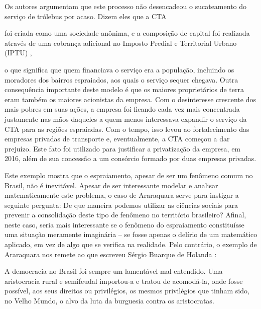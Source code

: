 Os autores argumentam que este processo não desencadeou o sucateamento do serviço de trólebus por acaso. Dizem eles que a CTA

\begin{displayquote}
    \textelp{} foi criada como uma sociedade anônima, e a composição de capital foi realizada através de uma cobrança adicional no Imposto Predial e Territorial Urbano (IPTU) \textelp{} \cite{BORCHERS:22},
\end{displayquote}
o que significa que quem financiava o serviço era a população, incluindo os moradores dos bairros espraiados, aos quais o serviço sequer chegava. Outra consequência importante deste modelo é que os maiores proprietários de terra eram também os maiores acionistas da empresa. Com o desinteresse crescente dos mais pobres em suas ações, a empresa foi ficando cada vez mais concentrada justamente nas mãos daqueles a quem menos interessava expandir o serviço da CTA para as regiões espraiadas. Com o tempo, isso levou ao fortalecimento das empresas privadas de transporte e, eventualmente, a CTA começou a dar prejuízo. Este fato foi utilizado para justificar a privatização da empresa, em 2016, além de sua concessão a um consórcio formado por duas empresas privadas.

Este exemplo mostra que o espraiamento, apesar de ser um fenômeno comum no Brasil, não é inevitável. Apesar de ser interessante modelar e analisar matematicamente este problema, o caso de Araraquara serve para instigar a seguinte pergunta: De que maneira podemos utilizar as ciências sociais para prevenir a consolidação deste tipo de fenômeno no território brasileiro? Afinal, neste caso, seria mais interessante se o fenômeno do espraiamento constituísse uma situação meramente imaginária -- se fosse apenas o delírio de um matemático aplicado, em vez de algo que se verifica na realidade. Pelo contrário, o exemplo de Araraquara nos remete ao que escreveu Sérgio Buarque de Holanda \cite{HOLANDA:20}:

\begin{displayquote}
    A democracia no Brasil foi sempre um lamentável mal-entendido. Uma aristocracia rural e semifeudal importou-a e tratou de acomodá-la, onde fosse possível, aos seus direitos ou privilégios, os mesmos privilégios que tinham sido, no Velho Mundo, o alvo da luta da burguesia contra os aristocratas.
\end{displayquote}